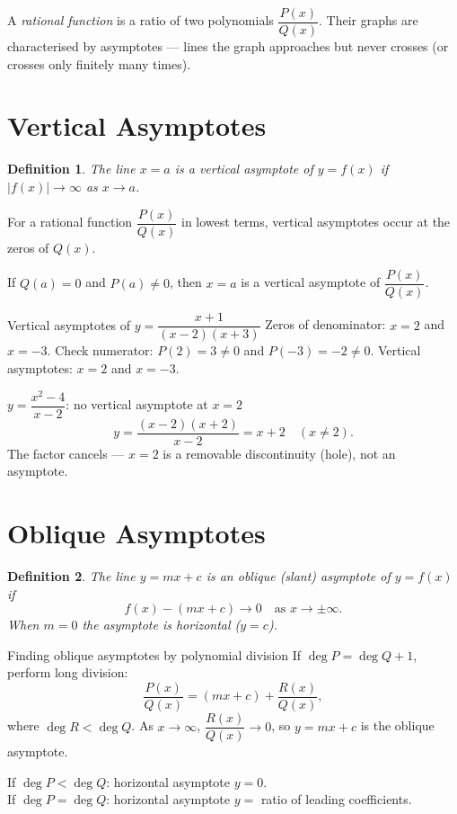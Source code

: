 \documentclass[12pt,a4paper]{article}
\theoremstyle{defstyle}
\newtheorem{definition}{Definition}[section]
\begin{document}
A \emph{rational function} is a ratio of two polynomials \(\dfrac{P(x)}{Q(x)}\).
Their graphs are characterised by asymptotes --- lines the graph approaches but never crosses (or crosses only finitely many times).

\section{Vertical Asymptotes}

\begin{definition}
The line \(x=a\) is a \emph{vertical asymptote} of \(y=f(x)\) if \(|f(x)|\to\infty\) as \(x\to a\).
\end{definition}

For a rational function \(\dfrac{P(x)}{Q(x)}\) in lowest terms, vertical asymptotes occur at the zeros of \(Q(x)\).

\begin{result}{}{}
If \(Q(a)=0\) and \(P(a)\neq 0\), then \(x=a\) is a vertical asymptote of \(\dfrac{P(x)}{Q(x)}\).
\end{result}

\begin{example}{Vertical asymptotes of $y=\dfrac{x+1}{(x-2)(x+3)}$}{}
Zeros of denominator: \(x=2\) and \(x=-3\).
Check numerator: \(P(2)=3\neq0\) and \(P(-3)=-2\neq0\).
Vertical asymptotes: \(x=2\) and \(x=-3\).
\end{example}

\begin{example}{$y=\dfrac{x^2-4}{x-2}$: no vertical asymptote at $x=2$}{}
\[
  y=\frac{(x-2)(x+2)}{x-2}=x+2\quad(x\neq2).
\]
The factor cancels --- \(x=2\) is a removable discontinuity (hole), not an asymptote.
\end{example}

\section{Oblique Asymptotes}

\begin{definition}
The line \(y=mx+c\) is an \emph{oblique (slant) asymptote} of \(y=f(x)\) if
\[
  f(x)-(mx+c)\to 0\quad\text{as }x\to\pm\infty.
\]
When \(m=0\) the asymptote is horizontal (\(y=c\)).
\end{definition}

\begin{result}{Finding oblique asymptotes by polynomial division}{}
If \(\deg P = \deg Q + 1\), perform long division:
\[
  \frac{P(x)}{Q(x)} = (mx+c) + \frac{R(x)}{Q(x)},
\]
where \(\deg R < \deg Q\).  As \(x\to\infty\), \(\dfrac{R(x)}{Q(x)}\to 0\), so \(y=mx+c\) is the oblique asymptote.

If \(\deg P < \deg Q\): horizontal asymptote \(y=0\).\\
If \(\deg P = \deg Q\): horizontal asymptote \(y=\) ratio of leading coefficients.
\end{result}
\end{document}
